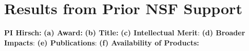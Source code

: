 \section{Results from Prior NSF Support}
\label{sec:prior_results}

\noindent
\textbf{PI Hirsch:}
\textbf{(a) Award:} 
\textbf{(b) Title:} 
\textbf{(c) Intellectual Merit}:  
\textbf{(d) Broader Impacts}:  
\textbf{(e) Publications}:
\textbf{(f) Availability of Products:} 

